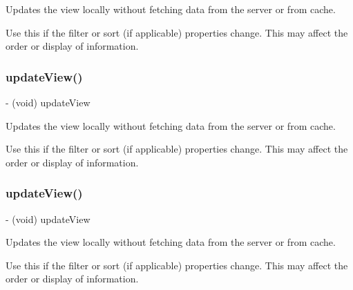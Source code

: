 Updates the view locally without fetching data from the server or from cache.

Use this if the filter or sort (if applicable) properties change. This may affect the order or display of information. \mbox{\label{interfaceFBGraphObjectPickerViewController_a4553f2ebea1891b75c18551c7a9cefc5}} 
\subsubsection{\texorpdfstring{update\+View()}{updateView()}\hspace{0.1cm}{\footnotesize\ttfamily [4/5]}}
{\footnotesize\ttfamily -\/ (void) update\+View \begin{DoxyParamCaption}{ }\end{DoxyParamCaption}}

Updates the view locally without fetching data from the server or from cache.

Use this if the filter or sort (if applicable) properties change. This may affect the order or display of information. \mbox{\label{interfaceFBGraphObjectPickerViewController_a4553f2ebea1891b75c18551c7a9cefc5}} 
\subsubsection{\texorpdfstring{update\+View()}{updateView()}\hspace{0.1cm}{\footnotesize\ttfamily [5/5]}}
{\footnotesize\ttfamily -\/ (void) update\+View \begin{DoxyParamCaption}{ }\end{DoxyParamCaption}}

Updates the view locally without fetching data from the server or from cache.

Use this if the filter or sort (if applicable) properties change. This may affect the order or display of information. 

